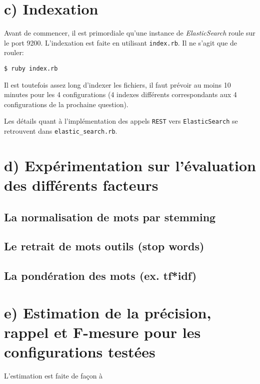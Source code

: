 \documentclass[12pt]{article}
\begin{document}
\section{c) Indexation}
Avant de commencer, il est primordiale qu'une instance de \textit{ElasticSearch} roule sur le port 9200. L'indexation est faite en utilisant \verb;index.rb;. Il ne s'agit que de rouler:

\begin{verbatim}
$ ruby index.rb
\end{verbatim}

Il est toutefois assez long d'indexer les fichiers, il faut prévoir au moins 10 minutes pour les 4 configurations (4 indexes différents correspondants aux 4 configurations de la prochaine question).

Les détails quant à l'implémentation des appels \verb;REST; vers \verb;ElasticSearch; se retrouvent dans \verb;elastic_search.rb;.

\section{d) Expérimentation sur l'évaluation des différents facteurs}
\subsection{La normalisation de mots par stemming}
\subsection{Le retrait de mots outils (stop words)}
\subsection{La pondération des mots (ex. tf*idf)}

\section{e) Estimation de la précision, rappel et F-mesure pour les configurations testées}

L'estimation est faite de façon à

\end{document}
